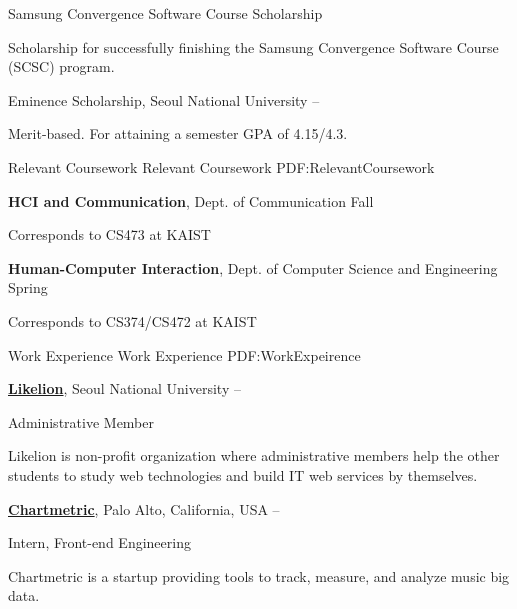 \documentclass[letterpaper,MMMyyyy,nonstopmode]{simpleresumecv}
\begin{document}
\begin{Body}
\Gap
\BulletItem
Samsung Convergence Software Course Scholarship
\hfill
{}
\begin{Detail}
\Item
Scholarship for successfully finishing the Samsung Convergence Software Course (SCSC) program.
\end{Detail}

\Gap
\BulletItem
Eminence Scholarship,
Seoul National University
\hfill
{} --
\begin{Detail}
\Item
Merit-based. For attaining a semester GPA of 4.15/4.3.
\end{Detail}


\BigGap
\Section
{Relevant Coursework}
{Relevant Coursework}
{PDF:RelevantCoursework}

\Entry
\textbf{HCI and Communication},
Dept. of Communication
\hfill
{} Fall

\Gap
\BulletItem
Corresponds to CS473 at KAIST

\BigGap
\Entry
\textbf{Human-Computer Interaction},
Dept. of Computer Science and Engineering
\hfill
{} Spring

\Gap
\BulletItem
Corresponds to CS374/CS472 at KAIST


\BigGap
\Section
{Work Experience}
{Work Experience}
{PDF:WorkExpeirence}

\Entry
\href{https://likelion.net}
{\textbf{Likelion}},
Seoul National University
\hfill
{} --

\Gap
\BulletItem
Administrative Member
\begin{Detail}
\SubBulletItem
Likelion is non-profit organization where administrative members help the other students to study web technologies and build IT web services by themselves.
\end{Detail}

\BigGap
\Entry
\href{https://chartmetric.io}
{\textbf{Chartmetric}},
Palo Alto, California, USA
\hfill
{} --

\Gap
\BulletItem
Intern, Front-end Engineering
\begin{Detail}
\SubBulletItem
Chartmetric is a startup providing tools to track, measure, and analyze music big data.
\end{Detail}




\end{Body}
\end{document}

